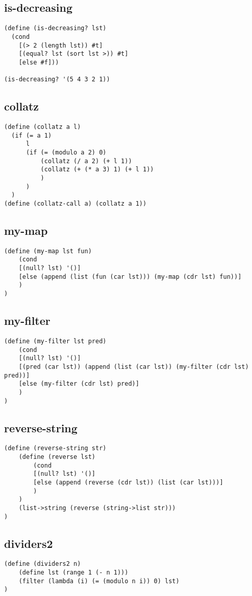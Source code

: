 \newpage
\begin{multicols}{2}[]

\subsection{is-decreasing}
\begin{lstlisting}
(define (is-decreasing? lst)
  (cond
    [(> 2 (length lst)) #t]
    [(equal? lst (sort lst >)) #t]
    [else #f]))

(is-decreasing? '(5 4 3 2 1))
\end{lstlisting}
\subsection{collatz}
\begin{lstlisting}
(define (collatz a l)
  (if (= a 1)
      l
      (if (= (modulo a 2) 0)
          (collatz (/ a 2) (+ l 1))
          (collatz (+ (* a 3) 1) (+ l 1))
          )
      )
  )
(define (collatz-call a) (collatz a 1))
\end{lstlisting}
\subsection{my-map}
\begin{lstlisting}
(define (my-map lst fun)
    (cond
    [(null? lst) '()]
    [else (append (list (fun (car lst))) (my-map (cdr lst) fun))]
    )
)
\end{lstlisting}
\subsection{my-filter}
\begin{lstlisting}
(define (my-filter lst pred)
    (cond
    [(null? lst) '()]
    [(pred (car lst)) (append (list (car lst)) (my-filter (cdr lst) pred))]
    [else (my-filter (cdr lst) pred)]
    )
)
\end{lstlisting}
\columnbreak
\subsection{reverse-string}
\begin{lstlisting}
(define (reverse-string str)
    (define (reverse lst)
        (cond
        [(null? lst) '()]
        [else (append (reverse (cdr lst)) (list (car lst)))]
        )
    )
    (list->string (reverse (string->list str)))
)
\end{lstlisting}
\subsection{dividers2}
\begin{lstlisting}
(define (dividers2 n)
    (define lst (range 1 (- n 1)))
    (filter (lambda (i) (= (modulo n i)) 0) lst)
)


\end{lstlisting}
\end{multicols}
